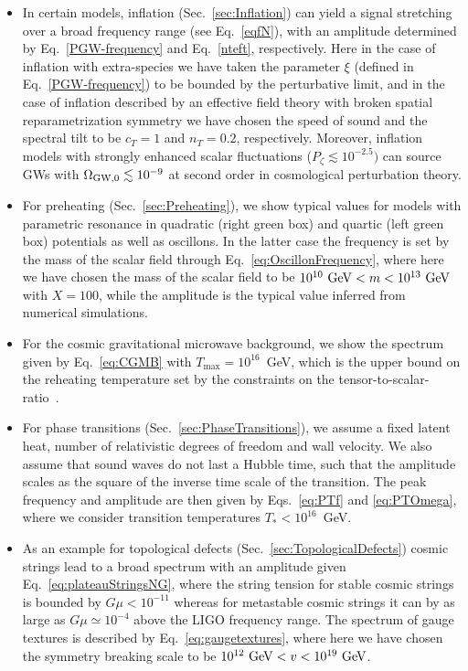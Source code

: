 \documentclass[11pt,a4paper]{article}
\begin{document}
\begin{itemize}
 \item In certain models, inflation (Sec.~\ref{sec:Inflation}) can yield a signal stretching over a broad frequency range (see Eq.~\eqref{eqfN}), with an amplitude determined by Eq.~\eqref{PGW-frequency} and Eq.~\eqref{nteft}, respectively.
Here in the case of inflation with extra-species we have taken the parameter $\xi$ (defined in Eq.~\eqref{PGW-frequency}) to be bounded by the perturbative limit,
and in the case of inflation described by an effective field theory with broken spatial reparametrization symmetry we have chosen the speed of sound and the spectral tilt to be $c_T = 1$ and $n_T = 0.2$, respectively. Moreover, inflation models with strongly enhanced scalar fluctuations ($P_\zeta \lesssim 10^{-2.5}) $ can source GWs with $\Omega_{\rm GW, 0} \lesssim 10^{-9}$ at second order in cosmological perturbation theory.
\item For preheating (Sec.~\ref{sec:Preheating}), we show typical values for models with parametric resonance in quadratic (right green box) and quartic (left green box) potentials as well as oscillons. In the latter case the frequency is set by the mass of the scalar field through Eq.~\eqref{eq:OscillonFrequency}, where here we have chosen the mass of the scalar field to be $10^{10} \ {\rm GeV} < m < 10^{13} \ {\rm GeV}$ with $X = 100$, while the amplitude is the typical value inferred from numerical simulations.
\item For the cosmic gravitational microwave background, we show the spectrum given by Eq.~\eqref{eq:CGMB} with $T_\text{max} = 10^{16}$~GeV, which is the upper bound on the reheating temperature set by the constraints on the tensor-to-scalar-ratio~\cite{Akrami:2018odb}.
\item For phase transitions (Sec.~\ref{sec:PhaseTransitions}), we assume a fixed latent heat, number of relativistic degrees of freedom and wall velocity. We also assume that sound waves do not last a Hubble time, such that the amplitude scales as the square of the inverse time scale of the transition.
The peak frequency and amplitude are then given by Eqs.~\eqref{eq:PTf} and \eqref{eq:PTOmega}, where we consider transition temperatures $T_* < 10^{16}$~GeV.
\item As an example for topological defects (Sec.~\ref{sec:TopologicalDefects}) cosmic strings lead to a broad spectrum with an amplitude given Eq.~\eqref{eq:plateauStringsNG}, where the string tension for stable cosmic strings is bounded by $G \mu < 10^{-11}$ whereas for metastable cosmic strings it can by as large as $G \mu \simeq 10^{-4}$ above the LIGO frequency range. The spectrum of gauge textures is described by Eq.~\eqref{eq:gaugetextures}, where here we have chosen the symmetry breaking scale to be $10^{12} \ {\rm GeV} < v < 10^{19}~\rm GeV$.
\end{itemize}
\end{document}
